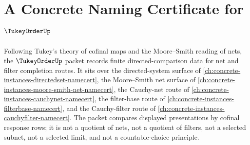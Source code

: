 \chapter{A Concrete Naming Certificate for $\TukeyOrderUp$}
\label{ch:concrete-instances-tukey-order-namecert}

Following Tukey's theory of cofinal maps and the Moore--Smith reading of nets, the $\TukeyOrderUp$ packet records finite directed-comparison data for net and filter completion routes. It sits over the directed-system surface of \autoref{ch:concrete-instances-directedset-namecert}, the Moore--Smith net surface of \autoref{ch:concrete-instances-moore-smith-net-namecert}, the Cauchy-net route of \autoref{ch:concrete-instances-cauchynet-namecert}, the filter-base route of \autoref{ch:concrete-instances-filterbase-namecert}, and the Cauchy-filter route of \autoref{ch:concrete-instances-cauchyfilter-namecert}. The packet compares displayed presentations by cofinal response rows; it is not a quotient of nets, not a quotient of filters, not a selected subnet, not a selected limit, and not a countable-choice principle.

